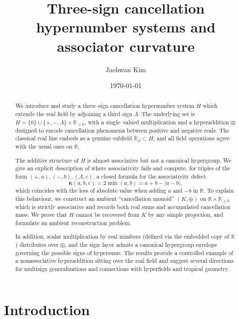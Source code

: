 \documentclass[11pt]{amsart}
\title[Three-sign cancellation hypernumbers]{Three-sign cancellation hypernumber systems and associator curvature}
\author{Jaehwan Kim}
\date{\today}
\numberwithin{equation}{section}
\theoremstyle{definition}
\theoremstyle{remark}
\newcommand{\AssocCurv}{\boldsymbol{\kappa}} %
\newcommand{\op}{\boxplus}                 %
\begin{document}
\begin{abstract}
We introduce and study a three--sign cancellation hypernumber system
$H$ which extends the real field by adjoining a third sign $\Lambda$.
The underlying set is $H=\{0\}\cup\{+,-,\Lambda\}\times\mathbb{R}_{>0}$,
with a single–valued multiplication and a hyperaddition $\boxplus$
designed to encode cancellation phenomena between positive and negative
reals. The classical real line embeds as a genuine subfield
$\mathbb{R}_{\mathrm{cl}}\subset H$, and all field operations agree
with the usual ones on $\mathbb{R}$.

The additive structure of $H$ is almost associative but not a canonical
hypergroup. We give an explicit description of where associativity
fails and compute, for triples of the form $(+,a),(-,b),(\Lambda,c)$,
a closed formula for the associativity defect
\[
  \AssocCurv(a,b,c)=2\min(a,b)=a+b-|a-b|,
\]
which coincides with the loss of absolute value when adding $a$ and
$-b$ in $\mathbb{R}$. To explain this behaviour, we construct an
ambient ``cancellation monoid'' $(K,\oplus)$ on $\mathbb{R}\times\mathbb{R}_{\ge0}$
which is strictly associative and records both real sums and accumulated
cancellation mass. We prove that $H$ cannot be recovered from $K$ by
any simple projection, and formulate an ambient reconstruction problem.

In addition, scalar multiplication by real numbers (defined via the embedded copy of $\mathbb{R}$) distributes over $\op$, and the sign--layer admits a canonical hypergroup envelope governing the possible signs of hyper\-sums. The results provide a controlled example of a non\-associative
hyperaddition sitting over the real field and suggest several directions
for multi\-sign generalizations and connections with hyperfields and
tropical geometry.
\end{abstract}

\maketitle

\tableofcontents


\section{Introduction}
\label{sec:intro}
\end{document}

